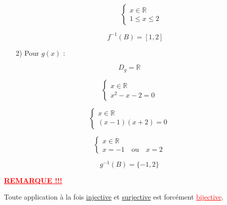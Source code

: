 \documentclass[a4paper,12pt]{article}
\begin{document}
\begin{enumerate}
\begin{itemize}
        \[
        \left\{
        \begin{array}{l}
            x \in \mathbb{R} \\
            1 \leq x \leq 2
        \end{array}
        \right.
        \]

    \end{itemize}

    \[
    \boxed{f^{-1}(B) = [1,2]}
    \]

    \item[2)] Pour \( g(x) \) :
\end{enumerate}
 \[
    D_g = \mathbb{R}
    \]

    \[
    \left\{
    \begin{array}{l}
        x \in \mathbb{R} \\
        x^2 - x - 2 = 0
    \end{array}
    \right.
    \]

    \[
    \left\{
    \begin{array}{l}
        x \in \mathbb{R} \\
        (x - 1)(x + 2) = 0
    \end{array}
    \right.
    \]

    \[
    \left\{
    \begin{array}{l}
        x \in \mathbb{R} \\
        x = -1 \quad \text{ou} \quad x = 2
    \end{array}
    \right.
    \]

    \[
    \boxed{g^{-1}(B) = \{-1,2\}}
    \]

\vspace{0.5cm}
\textcolor{red}{\textbf{\underline{REMARQUE !!!}}}  

Toute application à la fois \underline{injective} et \underline{surjective} est forcément \textcolor{red}{\underline{bijective}}.
\end{document}
